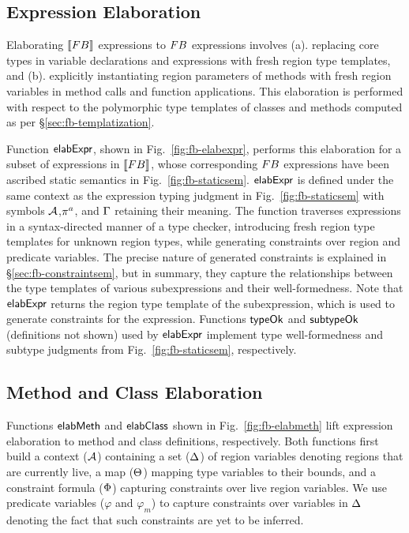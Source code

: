 




\subsection{Expression Elaboration}

Elaborating $\llbracket {\sc FB} \rrbracket$ expressions to ${\sc FB}$ expressions involves
(a). replacing core types in variable declarations and 
expressions with fresh region type templates, and (b). explicitly
instantiating region parameters of methods with fresh region variables
in method calls and function applications. This elaboration is
performed with respect to the polymorphic type templates of classes
and methods computed as per \S\ref{sec:fb-templatization}. 

Function ${\sf elabExpr}$, shown in Fig.~\ref{fig:fb-elabexpr}, performs
this elaboration for a subset of expressions in $\llbracket {\sc FB} \rrbracket$, whose
corresponding ${\sc FB}$ expressions have been ascribed static semantics in
Fig.~\ref{fig:fb-staticsem}. ${\sf elabExpr}$ is defined under the same
context as the expression typing judgment in
Fig.~\ref{fig:fb-staticsem} with symbols ${\mathcal{A}}$,$\pi^a$, and $\Gamma$
retaining their meaning. The function traverses expressions in a
syntax-directed manner of a type checker, introducing fresh region
type templates for unknown region types, while generating constraints
over region and predicate variables. The precise nature of generated
constraints is explained in \S\ref{sec:fb-constraintsem}, but in
summary, they capture the relationships between the type templates of
various subexpressions and their well-formedness. Note that
${\sf elabExpr}$ returns the region type template of the subexpression,
which is used to generate constraints for the expression. Functions
${\sf typeOk}$ and ${\sf subtypeOk}$ (definitions not shown) used by ${\sf elabExpr}$
implement type well-formedness and subtype judgments from
Fig.~\ref{fig:fb-staticsem}, respectively.

\subsection{Method and Class Elaboration}

Functions ${\sf elabMeth}$ and ${\sf elabClass}$ shown in
Fig.~\ref{fig:fb-elabmeth} lift expression elaboration to method and
class definitions, respectively. Both functions first build a context
(${\mathcal{A}}$) containing a set ($ \Delta$) of region variables denoting
regions that are currently live, a map ($\Theta$) mapping type
variables to their bounds, and a constraint formula ($\Phi$)
capturing constraints over live region variables. We use predicate
variables ($\varphi$ and $\varphi_m$) to capture constraints over
variables in $\Delta$ denoting the fact that such constraints are yet
to be inferred.

